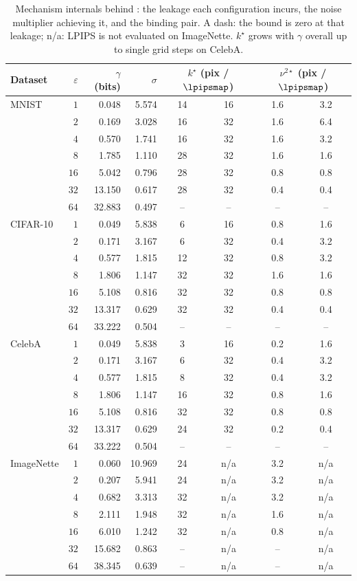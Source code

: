 \begin{table}[htbp]\centering\small
\begin{tabular}{l r r r cc cc}
\toprule
Dataset & $\varepsilon$ & $\gamma$ (bits) & $\sigma$ & \multicolumn{2}{c}{$k^\star$ (pix / $\lpipsmap$)} & \multicolumn{2}{c}{$\nu^{2\star}$ (pix / $\lpipsmap$)} \\
\midrule
MNIST & $1$ & 0.048 & 5.574 & 14 & 16 & 1.6 & 3.2 \\
 & $2$ & 0.169 & 3.028 & 16 & 32 & 1.6 & 6.4 \\
 & $4$ & 0.570 & 1.741 & 16 & 32 & 1.6 & 3.2 \\
 & $8$ & 1.785 & 1.110 & 28 & 32 & 1.6 & 1.6 \\
 & $16$ & 5.042 & 0.796 & 28 & 32 & 0.8 & 0.8 \\
 & $32$ & 13.150 & 0.617 & 28 & 32 & 0.4 & 0.4 \\
 & $64$ & 32.883 & 0.497 & -- & -- & -- & -- \\
\midrule
CIFAR-10 & $1$ & 0.049 & 5.838 & 6 & 16 & 0.8 & 1.6 \\
 & $2$ & 0.171 & 3.167 & 6 & 32 & 0.4 & 3.2 \\
 & $4$ & 0.577 & 1.815 & 12 & 32 & 0.8 & 3.2 \\
 & $8$ & 1.806 & 1.147 & 32 & 32 & 1.6 & 1.6 \\
 & $16$ & 5.108 & 0.816 & 32 & 32 & 0.8 & 0.8 \\
 & $32$ & 13.317 & 0.629 & 32 & 32 & 0.4 & 0.4 \\
 & $64$ & 33.222 & 0.504 & -- & -- & -- & -- \\
\midrule
CelebA & $1$ & 0.049 & 5.838 & 3 & 16 & 0.2 & 1.6 \\
 & $2$ & 0.171 & 3.167 & 6 & 32 & 0.4 & 3.2 \\
 & $4$ & 0.577 & 1.815 & 8 & 32 & 0.4 & 3.2 \\
 & $8$ & 1.806 & 1.147 & 16 & 32 & 0.8 & 1.6 \\
 & $16$ & 5.108 & 0.816 & 32 & 32 & 0.8 & 0.8 \\
 & $32$ & 13.317 & 0.629 & 24 & 32 & 0.2 & 0.4 \\
 & $64$ & 33.222 & 0.504 & -- & -- & -- & -- \\
\midrule
ImageNette & $1$ & 0.060 & 10.969 & 24 & n/a & 3.2 & n/a \\
 & $2$ & 0.207 & 5.941 & 24 & n/a & 3.2 & n/a \\
 & $4$ & 0.682 & 3.313 & 32 & n/a & 3.2 & n/a \\
 & $8$ & 2.111 & 1.948 & 32 & n/a & 1.6 & n/a \\
 & $16$ & 6.010 & 1.242 & 32 & n/a & 0.8 & n/a \\
 & $32$ & 15.682 & 0.863 & -- & n/a & -- & n/a \\
 & $64$ & 38.345 & 0.639 & -- & n/a & -- & n/a \\
\bottomrule
\end{tabular}
\caption{Mechanism internals behind : the leakage each configuration incurs, the noise multiplier achieving it, and the binding pair. A dash: the bound is zero at that leakage; n/a: LPIPS is not evaluated on ImageNette. $k^\star$ grows with $\gamma$ overall up to single grid steps on CelebA.}
\label{tab:spectrum_full}
\end{table}
